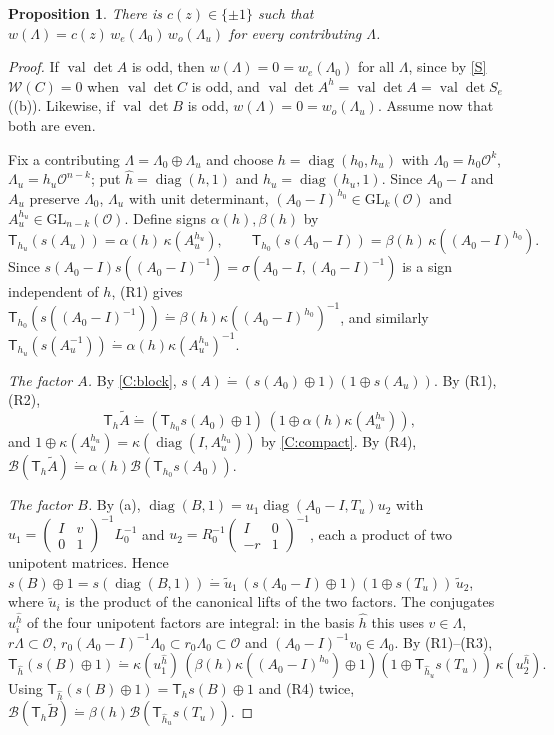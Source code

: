\documentclass[11pt,oneside,notitlepage]{book}
\numberwithin{equation}{section}
\theoremstyle{plain}
\newtheorem{proposition}[theorem]{Proposition}
\theoremstyle{definition}
\newcommand{\cO}{\mathcal{O}}
\newcommand{\GL}{\mathrm{GL}}
\newcommand{\cW}{\mathcal{W}}
\newcommand{\cB}{\mathcal{B}}
\newcommand{\val}{\operatorname{val}}
\newcommand{\diag}{\operatorname{diag}}
\newcommand{\T}{\mathsf{T}}
\renewcommand{\doteqdot}{\mathrel{\dot=}}
\begin{document}
\begin{proposition}\label{prop:phases}
There is $c(z)\in\{\pm1\}$ such that $w(\Lambda)=c(z)\,w_e(\Lambda_0)\,w_o(\Lambda_u)$ for every contributing $\Lambda$.
\end{proposition}
\begin{proof}
If $\val\det A$ is odd, then $w(\Lambda)=0=w_e(\Lambda_0)$ for all $\Lambda$, since by \ref{S} $\cW(C)=0$ when $\val\det C$ is odd, and $\val\det A^h=\val\det A=\val\det S_e$ ((b)). Likewise, if $\val\det B$ is odd, $w(\Lambda)=0=w_o(\Lambda_u)$. Assume now that both are even.

Fix a contributing $\Lambda=\Lambda_0\oplus\Lambda_u$ and choose $h=\diag(h_0,h_u)$ with $\Lambda_0=h_0\cO^k$, $\Lambda_u=h_u\cO^{n-k}$; put $\hat h=\diag(h,1)$ and $\hat h_u=\diag(h_u,1)$. Since $A_0-I$ and $A_u$ preserve $\Lambda_0$, $\Lambda_u$ with unit determinant, $(A_0-I)^{h_0}\in\GL_k(\cO)$ and $A_u^{h_u}\in\GL_{n-k}(\cO)$. Define signs $\alpha(h),\beta(h)$ by
\[\T_{h_u}(s(A_u))=\alpha(h)\,\kappa(A_u^{h_u}),\qquad\T_{h_0}(s(A_0-I))=\beta(h)\,\kappa((A_0-I)^{h_0}).\]
Since $s(A_0-I)s((A_0-I)^{-1})=\sigma(A_0-I,(A_0-I)^{-1})$ is a sign independent of $h$, (R1) gives $\T_{h_0}(s((A_0-I)^{-1}))\doteqdot\beta(h)\kappa((A_0-I)^{h_0})^{-1}$, and similarly $\T_{h_u}(s(A_u^{-1}))\doteqdot\alpha(h)\kappa(A_u^{h_u})^{-1}$.

\emph{The factor $A$.} By \ref{C:block}, $s(A)\doteqdot(s(A_0)\oplus1)(1\oplus s(A_u))$. By (R1), (R2),
\[\T_h\tilde A\doteqdot(\T_{h_0}s(A_0)\oplus1)\,(1\oplus\alpha(h)\kappa(A_u^{h_u})),\]
and $1\oplus\kappa(A_u^{h_u})=\kappa(\diag(I,A_u^{h_u}))$ by \ref{C:compact}. By (R4), $\cB(\T_h\tilde A)\doteqdot\alpha(h)\cB(\T_{h_0}s(A_0))$.

\emph{The factor $B$.} By (a), $\diag(B,1)=u_1\diag(A_0-I,T_u)u_2$ with $u_1=\left(\begin{smallmatrix}I&v\\0&1\end{smallmatrix}\right)^{-1}L_0^{-1}$ and $u_2=R_0^{-1}\left(\begin{smallmatrix}I&0\\-r&1\end{smallmatrix}\right)^{-1}$, each a product of two unipotent matrices. Hence $s(B)\oplus1=s(\diag(B,1))\doteqdot\tilde u_1\,(s(A_0-I)\oplus1)(1\oplus s(T_u))\,\tilde u_2$, where $\tilde u_i$ is the product of the canonical lifts of the two factors. The conjugates $u_i^{\hat h}$ of the four unipotent factors are integral: in the basis $\hat h$ this uses $v\in\Lambda$, $r\Lambda\subset\cO$, $r_0(A_0-I)^{-1}\Lambda_0\subset r_0\Lambda_0\subset\cO$ and $(A_0-I)^{-1}v_0\in\Lambda_0$. By (R1)--(R3),
\[\T_{\hat h}(s(B)\oplus1)\doteqdot\kappa(u_1^{\hat h})\,(\beta(h)\kappa((A_0-I)^{h_0})\oplus1)(1\oplus\T_{\hat h_u}s(T_u))\,\kappa(u_2^{\hat h}).\]
Using $\T_{\hat h}(s(B)\oplus1)=\T_hs(B)\oplus1$ and (R4) twice, $\cB(\T_h\tilde B)\doteqdot\beta(h)\cB(\T_{\hat h_u}s(T_u))$.


\end{proof}
\end{document}
